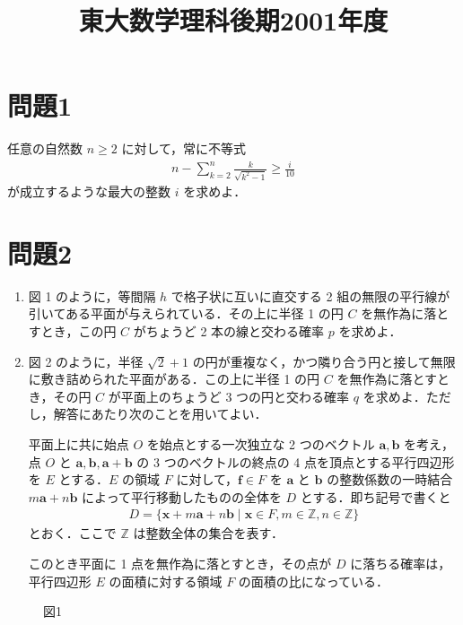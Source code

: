 \documentclass[unicode,12pt, A4j]{ltjsarticle}%
\title{東大数学理科後期2001年度}
\author{}
\date{}
\begin{document}
\maketitle

\section{問題1}
任意の自然数 $n \ge 2$ に対して，常に不等式
\begin{align}
 n - \sum_{k=2}^{n} \frac{k}{\sqrt{k^2 - 1}} \ge \frac{i}{10}
\end{align}
が成立するような最大の整数 $i$ を求めよ．


\section{問題2}
\begin{enumerate}
    \item 図 1 のように，等間隔 $h$ で格子状に互いに直交する 2 組の無限の平行線が引いてある平面が与えられている．その上に半径 1 の円 $C$ を無作為に落とすとき，この円 $C$ がちょうど 2 本の線と交わる確率 $p$ を求めよ．
    \item 図 2 のように，半径 $\sqrt{2} + 1$ の円が重複なく，かつ隣り合う円と接して無限に敷き詰められた平面がある．この上に半径 1 の円 $C$ を無作為に落とすとき，その円 $C$ が平面上のちょうど 3 つの円と交わる確率 $q$ を求めよ．ただし，解答にあたり次のことを用いてよい．

    平面上に共に始点 $O$ を始点とする一次独立な 2 つのベクトル $\mathbf{a}, \mathbf{b}$ を考え，点 $O$ と $\mathbf{a}, \mathbf{b}, \mathbf{a} + \mathbf{b}$ の 3 つのベクトルの終点の 4 点を頂点とする平行四辺形を $E$ とする．$E$ の領域 $F$ に対して，$\mathbf{f} \in F$ を $\mathbf{a}$ と $\mathbf{b}$ の整数係数の一時結合 $m\mathbf{a} + n\mathbf{b}$ によって平行移動したものの全体を $D$ とする．即ち記号で書くと
    \begin{align}
         D = \{\mathbf{x} + m\mathbf{a} + n\mathbf{b} \mid \mathbf{x} \in F, m \in \mathbb{Z}, n \in \mathbb{Z} \}
    \end{align}
    とおく．ここで $\mathbb{Z}$ は整数全体の集合を表す．

    このとき平面に 1 点を無作為に落とすとき，その点が $D$ に落ちる確率は，平行四辺形 $E$ の面積に対する領域 $F$ の面積の比になっている．
\end{enumerate}

    \begin{figure}[h]
     \centering
     \caption{図1}
    \end{figure}
\end{document}
